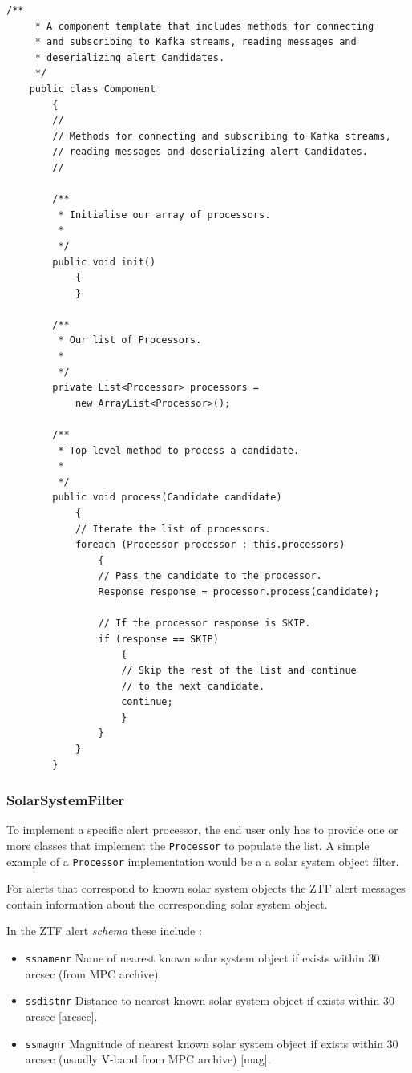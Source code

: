 \documentclass{article}
\newcommand{\avschema} {\textit{schema}\xspace}
\newcommand{\ztf} {ZTF\xspace}
\begin{document}
\begin{lstlisting}[style=Java]
    /**
     * A component template that includes methods for connecting
     * and subscribing to Kafka streams, reading messages and
     * deserializing alert Candidates.
     */
    public class Component
        {
        //
        // Methods for connecting and subscribing to Kafka streams,
        // reading messages and deserializing alert Candidates.
        //

        /**
         * Initialise our array of processors.
         *
         */
        public void init()
            {
            }

        /**
         * Our list of Processors.
         *
         */
        private List<Processor> processors =
            new ArrayList<Processor>();

        /**
         * Top level method to process a candidate.
         *
         */
        public void process(Candidate candidate)
            {
            // Iterate the list of processors.
            foreach (Processor processor : this.processors)
                {
                // Pass the candidate to the processor.
                Response response = processor.process(candidate);

                // If the processor response is SKIP.
                if (response == SKIP)
                    {
                    // Skip the rest of the list and continue
                    // to the next candidate.
                    continue;
                    }
                }
            }
        }
\end{lstlisting}

\subsubsection{SolarSystemFilter}
\label{java-interfaces.SolarSystemFilter}

To implement a specific alert processor, the end user only has to provide one or more classes that implement the \texttt{Processor} to populate the list. A simple example of a \texttt{Processor} implementation would be a a solar system object filter.

For alerts that correspond to known solar system objects the \ztf alert messages contain information about the corresponding solar system object.

In the \ztf alert \avschema these include :
\begin{itemize}
  \item \texttt{ssnamenr} Name of nearest known solar system object if exists within 30 arcsec (from MPC archive).
  \item \texttt{ssdistnr} Distance to nearest known solar system object if exists within 30 arcsec [arcsec].
  \item \texttt{ssmagnr} Magnitude of nearest known solar system object if exists within 30 arcsec (usually V-band from MPC archive) [mag].
\end{itemize}
\end{document}

